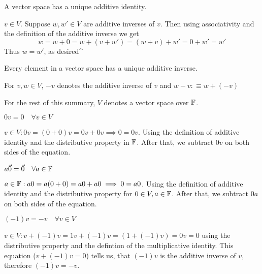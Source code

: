 \setcounter{thm}{25}
\begin{thm} 
  A vector space has a unique additive identity.
\end{thm}
\begin{prf}
  $v\in V.$ Suppose $w,w' \in V$ are additive inverses of $v$. Then using associativity and the definition of the additive inverse we get
  \begin{equation}
    w = w + 0 = w + (v + w') = (w+v) + w' = 0 + w' = w'
  \end{equation}
  Thus $w = w'$, as desired^
\end{prf}

\begin{thm} 
  Every element in a vector space has a unique additive inverse.
\end{thm}

\begin{mydef}
  For $v,w\in V$, $-v$ denotes the additive inverse of $v$ and $w-v:\equiv w+(-v)$
\end{mydef}

\begin{mydef}
  For the rest of this summary, $V$ denotes a vector space over $\mathbb{F}$.
\end{mydef}

\begin{thm} 
  $0v = 0 \quad \forall v\in V$
\end{thm}
\begin{prf}
  $v \in V: 0v = (0+0)v = 0v +0v \implies 0 = 0v$. Using the definition of additive identity and the distributive property in $\mathbb{F}$. After that, we subtract $0v$ on both sides of the equation.
\end{prf}

\begin{thm} 
  $a \vec0= \vec0 \quad \forall a\in \mathbb{F}$
\end{thm}
\begin{prf}
  $a \in \mathbb{F}: a0 = a(0+0) = a0 + a0 \implies 0 = a0$. Using the definition of additive identity and the distributive property for $0 \in V, a \in \mathbb{F}$. After that, we subtract $0a$ on both sides of the equation.
\end{prf}

\begin{thm} 
  \label{thm: minus one times a vector}
  $(-1)v = -v \quad \forall v\in V$
\end{thm}
\begin{prf}
  $v \in V: v + (-1)v = 1v + (-1)v = (1 + (-1)v) = 0v = 0$ using the distributive property and the defintion of the multiplicative identity. This equation ($v+(-1)v=0$) tells us, that $(-1)v$ is the additive inverse of $v$, therefore $(-1)v = -v$.
\end{prf}
